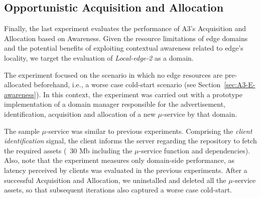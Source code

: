 


\subsection{Opportunistic Acquisition and Allocation}

Finally, the last experiment evaluates the performance of A3's Acquisition and Allocation based on Awareness. Given the resource limitations of edge domains and the potential benefits of exploiting contextual awareness related to edge's locality, we target the evaluation of \textit{Local-edge-2} as a domain. 

The experiment focused on the scenario in which no edge resources are pre-allocated beforehand, i.e., a worse case cold-start scenario (see Section~\ref{sec:A3-E-awareness}). In this context, the experiment was carried out with a prototype implementation of a domain manager responsible for the advertisement, identification, acquisition and allocation of a new $\mu$-service by that domain.


The sample $\mu$-service was similar to previous experiments. Comprising the \textit{client identification} signal, the client informs the server regarding the repository to fetch the required assets (~30 Mb including the $\mu$-service function and dependencies).
Also, note that the experiment measures only domain-side performance, as latency perceived by clients was evaluated in the previous experiments. After a successful Acquisition and Allocation, we uninstalled and deleted all the $\mu$-service assets, so that subsequent iterations also captured a worse case cold-start.

